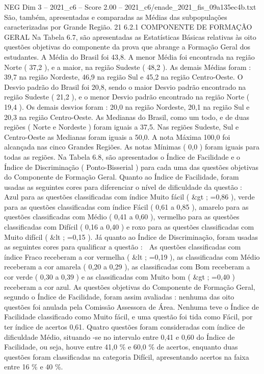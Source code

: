 \begin{textsample}{NEG Dim 3 – 2021\_c6 – Score 2.00 – 2021\_c6/enade\_2021\_fis\_09a135ec4b.txt}
São, também, apresentadas e comparadas as Médias das subpopulações caracterizadas por Grande Região. 21 6.2.1 COMPONENTE DE FORMAÇÃO GERAL Na Tabela 6.7, são apresentadas as Estatísticas Básicas relativas às oito questões objetivas do componente da prova que abrange a Formação Geral dos estudantes.
A Média do Brasil foi 43,8.
A menor Média foi encontrada na região Norte ( 37,2 ), e a maior, na região Sudeste ( 48,2 ).
As demais Médias foram : 39,7 na região Nordeste, 46,9 na região Sul e 45,2 na região Centro-Oeste.
O Desvio padrão do Brasil foi 20,8, sendo o maior Desvio padrão encontrado na região Sudeste ( 21,2 ), e o menor Desvio padrão encontrado na região Norte ( 19,4 ).
Os demais desvios foram : 20,0 na região Nordeste, 20,1 na região Sul e 20,3 na região Centro-Oeste.
As Medianas do Brasil, como um todo, e de duas regiões ( Norte e Nordeste ) foram iguais a 37,5.
Nas regiões Sudeste, Sul e Centro-Oeste as Medianas foram iguais a 50,0.
A nota Máxima 100,0 foi alcançada nas cinco Grandes Regiões.
As notas Mínimas ( 0,0 ) foram iguais para todas as regiões.
Na Tabela 6.8, são apresentados o Índice de Facilidade e o Índice de Discriminação ( Ponto-Bisserial ) para cada uma das questões objetivas do Componente de Formação Geral.
Quanto ao Índice de Facilidade, foram usadas as seguintes cores para diferenciar o nível de dificuldade da questão :  Azul para as questões classificadas com índice Muito fácil ( \&gt ; =0,86 ), verde para as questões classificadas com índice Fácil ( 0,61 a 0,85 ), amarelo para as questões classificadas com Médio ( 0,41 a 0,60 ), vermelho para as questões classificadas com Difícil ( 0,16 a 0,40 ) e roxo para as questões classificadas com Muito difícil ( \&lt ; =0,15 ).
Já quanto ao Índice de Discriminação, foram usadas as seguintes cores para qualificar a questão :  As questões classificadas com índice Fraco receberam a cor vermelha ( \&lt ; =0,19 ), as classificadas com Médio receberam a cor amarela ( 0,20 a 0,29 ), as classificadas com Bom receberam a cor verde ( 0,30 a 0,39 ) e as classificadas com Muito bom ( \&gt ; =0,40 ) receberam a cor azul.
As questões objetivas do Componente de Formação Geral, segundo o Índice de Facilidade, foram assim avaliadas : nenhuma das oito questões foi anulada pela Comissão Assessora de Área.
Nenhuma teve o Índice de Facilidade classificado como Muito fácil, e uma questão foi tida como Fácil, por ter índice de acertos 0,61.
Quatro questões foram consideradas com índice de dificuldade Médio, situando -se no intervalo entre 0,41 e 0,60 do Índice de Facilidade, ou seja, houve entre 41,0 \% e 60,0 \% de acertos, enquanto duas questões foram classificadas na categoria Difícil, apresentando acertos na faixa entre 16 \% e 40 \%.

\end{textsample}
